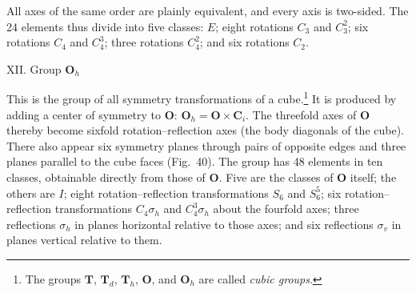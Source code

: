 \begin{figure}[ht]
\centering
{}
\caption{}
\label{fig:93-39}
\end{figure}

\begin{figure}[ht]
\centering
{}
\caption{}
\label{fig:93-40}
\end{figure}

All axes of the same order are plainly equivalent, and every axis is two-sided. The 24 elements thus divide into five classes: $E$; eight rotations $C_3$ and $C_3^2$; six rotations $C_4$ and $C_4^3$; three rotations $C_4^2$; and six rotations $C_2$.

\medskip
\noindent XII. Group $\boldsymbol{O}_h$

This is the group of all symmetry transformations of a cube.\footnote{The groups $\boldsymbol{T}$, $\boldsymbol{T}_d$, $\boldsymbol{T}_h$, $\boldsymbol{O}$, and $\boldsymbol{O}_h$ are called \emph{cubic groups}.} It is produced by adding a center of symmetry to $\boldsymbol{O}$: $\boldsymbol{O}_h=\boldsymbol{O}\times\boldsymbol{C}_i$. The threefold axes of $\boldsymbol{O}$ thereby become sixfold rotation--reflection axes (the body diagonals of the cube). There also appear six symmetry planes through pairs of opposite edges and three planes parallel to the cube faces (Fig.~40). The group has 48 elements in ten classes, obtainable directly from those of $\boldsymbol{O}$. Five are the classes of $\boldsymbol{O}$ itself; the others are $I$; eight rotation--reflection transformations $S_6$ and $S_6^5$; six rotation--reflection transformations $C_4\sigma_h$ and $C_4^3\sigma_h$ about the fourfold axes; three reflections $\sigma_h$ in planes horizontal relative to those axes; and six reflections $\sigma_v$ in planes vertical relative to them.

